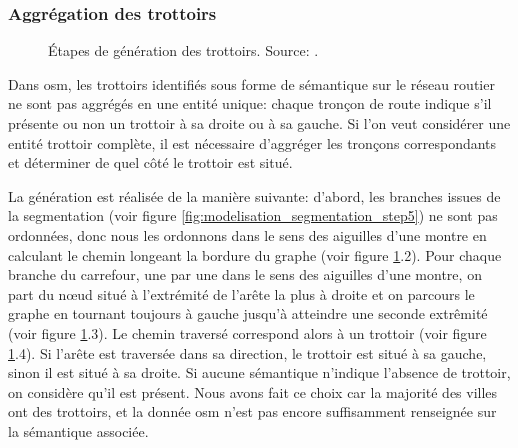 \subsubsection{Aggrégation des trottoirs}

\begin{figure}[ht]
    \centering
    \caption[Génération de trottoirs]{Étapes de génération des trottoirs. Source: \citep{Kalsron2022}.}
    \label{fig:modelisation_calcul_pieton_trottoirs}
\end{figure}

Dans \gls{osm}, les trottoirs identifiés sous forme de sémantique sur le réseau routier ne sont pas aggrégés en une entité unique: chaque tronçon de route indique s'il présente ou non un trottoir à sa droite ou à sa gauche. Si l'on veut considérer une entité trottoir complète, il est nécessaire d'aggréger les tronçons correspondants et déterminer de quel côté le trottoir est situé.

La génération est réalisée de la manière suivante: d'abord, les branches issues de la segmentation (voir figure \ref{fig:modelisation_segmentation_step5}) ne sont pas ordonnées, donc nous les ordonnons dans le sens des aiguilles d'une montre en calculant le chemin longeant la bordure du graphe (voir figure \ref{fig:modelisation_calcul_pieton_trottoirs}.2). Pour chaque branche du carrefour, une par une dans le sens des aiguilles d'une montre, on part du nœud situé à l'extrémité de l'arête la plus à droite et on parcours le graphe en tournant toujours à gauche jusqu'à atteindre une seconde extrêmité (voir figure \ref{fig:modelisation_calcul_pieton_trottoirs}.3). Le chemin traversé correspond alors à un trottoir (voir figure \ref{fig:modelisation_calcul_pieton_trottoirs}.4). Si l'arête est traversée dans sa direction, le trottoir est situé à sa gauche, sinon il est situé à sa droite. Si aucune sémantique n'indique l'absence de trottoir, on considère qu'il est présent. Nous avons fait ce choix car la majorité des villes ont des trottoirs, et la donnée \gls{osm} n'est pas encore suffisamment renseignée sur la sémantique associée.

